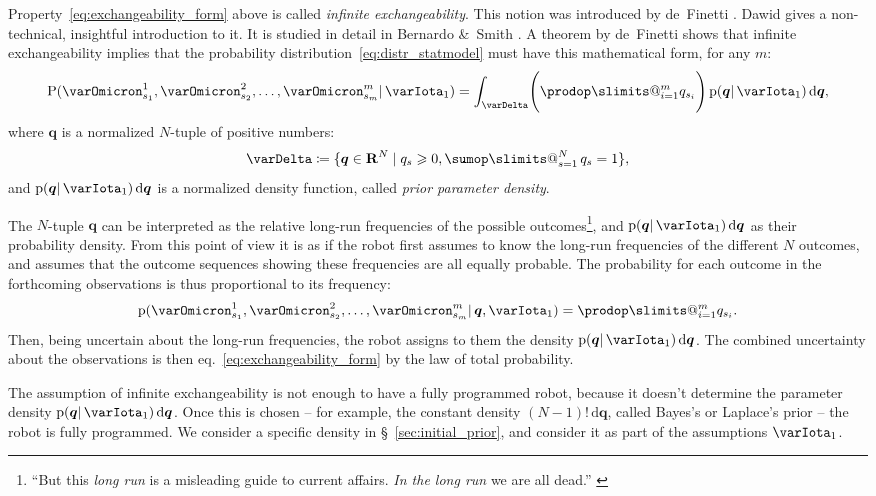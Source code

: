 \documentclass[\ifafour a4paper,12pt,\else a5paper,10pt,\fi%
onecolumn,oneside,article,%
british%
]{memoir}
\makeatletter
\theoremstyle{remark}
\theoremstyle{innote}
\def\sum{\DOTSI\sumop\slimits@}
\def\prod{\DOTSI\prodop\slimits@}
\let\parentext=\parentexttrack%
\newcommand*{\citep}{\parencites}
\newcommand*{\citey}{\parencites*}
\newcommand*{\amp}{\&}
\newcommand*{\di}{\mathrm{d}}%
\newcommand*{\RR}{\bm{\mathrm{R}}}
\newcommand*{\defd}{\coloneqq}
\newcommand*{\suchthat}{\mid}%
\renewcommand{\ge}{\geqslant}%
\DeclarePairedDelimiter\set{\{}{\}}
\newcommand*{\pf}{\mathrm{p}}%
\newcommand*{\p}{\mathrm{P}}%
\renewcommand*{\|}{\mathpunct{|}}
\newcommand*{\sect}{\S}%
\newcommand*{\eqn}{eq.}%
\newcommand*{\tsum}{\mathop{\textstyle\sum}\nolimits}
\newcommand*{\simpl}{\varDelta}
\newcommand*{\yqq}{q}
\newcommand*{\yq}{\bm{\yqq}}
\newcommand*{\yI}{\varIota}
\newcommand*{\yMJ}{\yI_1}
\makeatother
\begin{document}
Property~\eqref{eq:exchangeability_form} above is called \emph{infinite
  exchangeability}. This notion was introduced by de~Finetti
\parentext{\cite*{definetti1930,definetti1937}; \cite{heathetal1976}}.
Dawid \citey{dawid2013} gives a non-technical, insightful introduction to
it. It is studied in detail in Bernardo \amp\ Smith
\citey[\sect~4.2]{bernardoetal1994_r2000}. A theorem by de~Finetti shows
that infinite exchangeability implies that the probability
distribution~\eqref{eq:distr_statmodel} must have this mathematical form,
for any $m$:
\begin{equation}
  \label{eq:exchangeability_form}
  \p(\varOmicron^1_{s_1} , \varOmicron^2_{s_2} , \dotsc , \varOmicron^m_{s_m} \| \yMJ) =
  \int_\simpl   \Biggl( \prod_{i=1}^m \yqq_{s_i} \Biggr)\, \pf(\yq \| \yMJ)\,\di\yq,
\end{equation}
where $\yq$ is a normalized $N$-tuple of positive numbers:
\begin{equation}
\simpl \defd \set{\yq \in \RR^N \suchthat \yqq_s\ge0,
  \tsum_{s=1}^N\yqq_s=1},
\label{eq:simplex}
\end{equation}
and $\pf(\yq \| \yMJ)\,\di\yq$ is a normalized density function, called
\emph{prior parameter density}.

The $N$-tuple $\yq$ can be interpreted as the relative long-run frequencies
of the possible outcomes\footnote{\enquote{But this \emph{long run} is a
    misleading guide to current affairs. \emph{In the long run} we are all
    dead.} \citep[\sect~3.I, p.~65]{keynes1923_r2013}}, and
$\pf(\yq \| \yMJ)\,\di\yq$ as their probability density. From this point of
view it is as if the robot first assumes to know the long-run frequencies
of the different $N$ outcomes, and assumes that the outcome sequences
showing these frequencies are all equally probable. The probability for
each outcome in the forthcoming observations is thus proportional to its
frequency:
\begin{equation}
  \label{eq:param_conditional_definetti}
  \pf(\varOmicron^1_{s_1} , \varOmicron^2_{s_2} , \dotsc , \varOmicron^m_{s_m}  \| \yq,\yMJ)
  = \prod_{i=1}^m \yqq_{s_i}.
\end{equation}
Then, being uncertain about the long-run frequencies, the robot assigns to
them the density $\pf(\yq \| \yMJ)\,\di\yq$. The combined uncertainty about
the observations is then \eqn~\eqref{eq:exchangeability_form} by the law of
total probability.

\medskip

The assumption of infinite exchangeability is not enough to have a fully
programmed robot, because it doesn't determine the parameter density
$\pf(\yq \| \yMJ)\,\di\yq$. Once this is chosen -- for example, the
constant density $(N-1)!\,\di\yq$, called Bayes's
\citey[Scholium]{bayes1763} or Laplace's \citey[p.~xvii]{laplace1814_r1819}
prior -- the robot is fully programmed. We consider a specific density in
\sect~\ref{sec:initial_prior}, and consider it as part of the assumptions
$\yMJ$.
\end{document}
